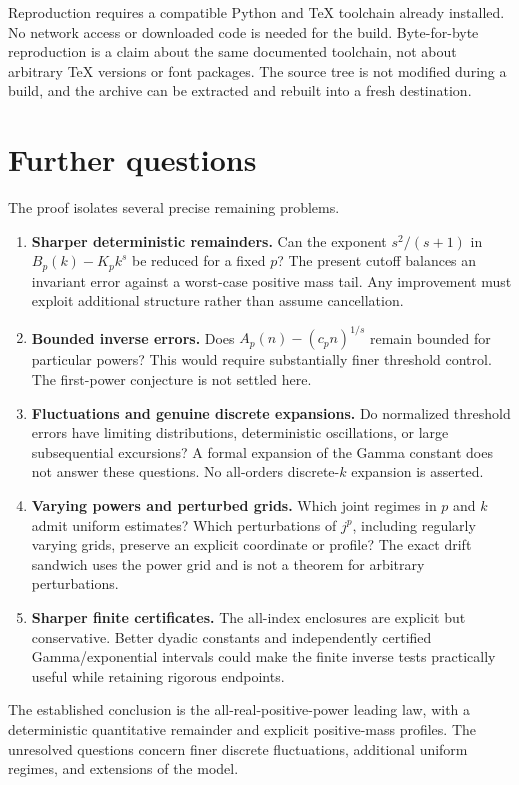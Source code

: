 Reproduction requires a compatible Python and \TeX{} toolchain already installed. No network access or downloaded code is needed for the build. Byte-for-byte reproduction is a claim about the same documented toolchain, not about arbitrary \TeX{} versions or font packages. The source tree is not modified during a build, and the archive can be extracted and rebuilt into a fresh destination.

\section{Further questions}\label{rex:qt:sec:questions}
The proof isolates several precise remaining problems.
\begin{enumerate}
 \item\label{rex:qt:q:sharper} \textbf{Sharper deterministic remainders.} Can the exponent $s^2/(s+1)$ in $B_p(k)-K_p k^s$ be reduced for a fixed $p$? The present cutoff balances an invariant error against a worst-case positive mass tail. Any improvement must exploit additional structure rather than assume cancellation.
 \item\label{rex:qt:q:bounded} \textbf{Bounded inverse errors.} Does $A_p(n)-(c_p n)^{1/s}$ remain bounded for particular powers? This would require substantially finer threshold control. The first-power conjecture is not settled here.
 \item\label{rex:qt:q:fluct} \textbf{Fluctuations and genuine discrete expansions.} Do normalized threshold errors have limiting distributions, deterministic oscillations, or large subsequential excursions? A formal expansion of the Gamma constant does not answer these questions. No all-orders discrete-$k$ expansion is asserted.
 \item\label{rex:qt:q:varying} \textbf{Varying powers and perturbed grids.} Which joint regimes in $p$ and $k$ admit uniform estimates? Which perturbations of $j^p$, including regularly varying grids, preserve an explicit coordinate or profile? The exact drift sandwich uses the power grid and is not a theorem for arbitrary perturbations.
 \item\label{rex:qt:q:certificates} \textbf{Sharper finite certificates.} The all-index enclosures are explicit but conservative. Better dyadic constants and independently certified Gamma/exponential intervals could make the finite inverse tests practically useful while retaining rigorous endpoints.
\end{enumerate}
The established conclusion is the all-real-positive-power leading law, with a deterministic quantitative remainder and explicit positive-mass profiles. The unresolved questions concern finer discrete fluctuations, additional uniform regimes, and extensions of the model.

